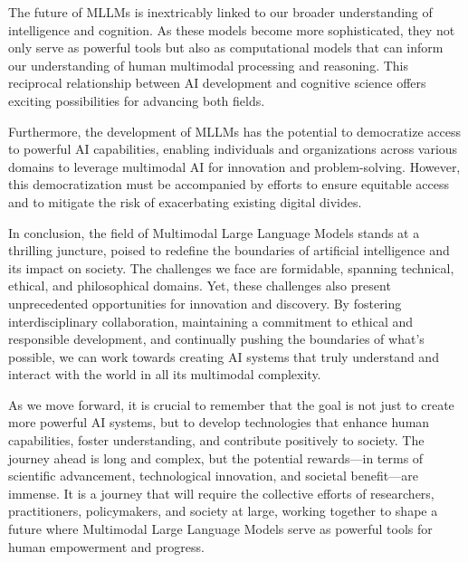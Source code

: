 The future of MLLMs is inextricably linked to our broader understanding of intelligence and cognition. As these models become more sophisticated, they not only serve as powerful tools but also as computational models that can inform our understanding of human multimodal processing and reasoning. This reciprocal relationship between AI development and cognitive science offers exciting possibilities for advancing both fields.

Furthermore, the development of MLLMs has the potential to democratize access to powerful AI capabilities, enabling individuals and organizations across various domains to leverage multimodal AI for innovation and problem-solving. However, this democratization must be accompanied by efforts to ensure equitable access and to mitigate the risk of exacerbating existing digital divides.

In conclusion, the field of Multimodal Large Language Models stands at a thrilling juncture, poised to redefine the boundaries of artificial intelligence and its impact on society. The challenges we face are formidable, spanning technical, ethical, and philosophical domains. Yet, these challenges also present unprecedented opportunities for innovation and discovery. By fostering interdisciplinary collaboration, maintaining a commitment to ethical and responsible development, and continually pushing the boundaries of what's possible, we can work towards creating AI systems that truly understand and interact with the world in all its multimodal complexity.

As we move forward, it is crucial to remember that the goal is not just to create more powerful AI systems, but to develop technologies that enhance human capabilities, foster understanding, and contribute positively to society. The journey ahead is long and complex, but the potential rewards—in terms of scientific advancement, technological innovation, and societal benefit—are immense. It is a journey that will require the collective efforts of researchers, practitioners, policymakers, and society at large, working together to shape a future where Multimodal Large Language Models serve as powerful tools for human empowerment and progress.




